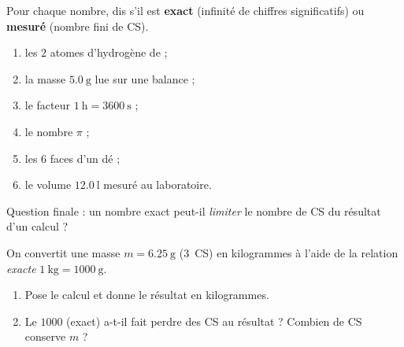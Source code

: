 \documentclass[11pt,a4paper]{article}
\newcommand{\CS}{chiffres significatifs}
\begin{document}
\begin{exo}
Pour chaque nombre, dis s'il est \textbf{exact} (infinité de \CS) ou \textbf{mesuré} (nombre fini de CS).
\begin{enumerate}[label=\alph*),leftmargin=1.6em,itemsep=1pt]
  \item les $2$ atomes d'hydrogène de  ;
  \item la masse $\qty{5,0}{\gram}$ lue sur une balance ;
  \item le facteur $\qty{1}{\hour}=\qty{3600}{\second}$ ;
  \item le nombre $\pi$ ;
  \item les $6$ faces d'un dé ;
  \item le volume $\qty{12,0}{\litre}$ mesuré au laboratoire.
\end{enumerate}
Question finale : un nombre exact peut-il \emph{limiter} le nombre de CS du résultat d'un calcul ?
\end{exo}

\begin{exo}
On convertit une masse $m = \qty{6,25}{\gram}$ ($3$~CS) en kilogrammes à l'aide de la relation
\emph{exacte} $\qty{1}{\kilo\gram}=\qty{1000}{\gram}$.
\begin{enumerate}[label=\alph*),leftmargin=1.6em,itemsep=1pt]
  \item Pose le calcul et donne le résultat en kilogrammes.
  \item Le $\num{1000}$ (exact) a-t-il fait perdre des CS au résultat ? Combien de CS conserve $m$ ?
\end{enumerate}
\end{exo}
\end{document}
